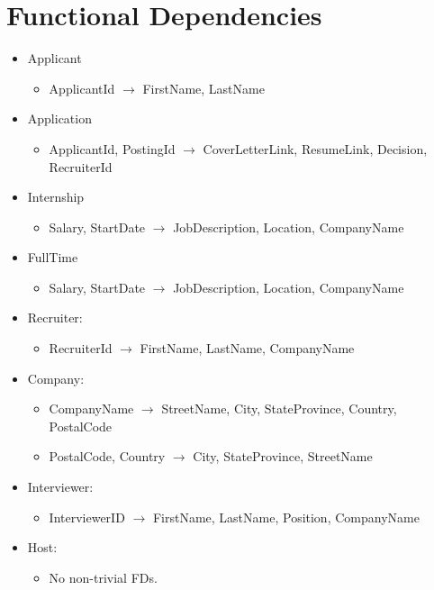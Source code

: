 \section{Functional Dependencies}

\begin{itemize}
  \item Applicant
    \begin{itemize}
      \item ApplicantId $ \to $ FirstName, LastName
    \end{itemize}
  \item Application
    \begin{itemize}
      \item ApplicantId, PostingId $ \to $ CoverLetterLink, ResumeLink, Decision, RecruiterId
    \end{itemize}
  \item Internship
    \begin{itemize}
      \item Salary, StartDate $ \to $ JobDescription, Location, CompanyName
    \end{itemize}
  \item FullTime
    \begin{itemize}
      \item Salary, StartDate $ \to $ JobDescription, Location, CompanyName
    \end{itemize}
  \item Recruiter:
    \begin{itemize}
      \item RecruiterId $ \to $ FirstName, LastName, CompanyName
    \end{itemize}
  \item Company:
    \begin{itemize}
      \item CompanyName $ \to $ StreetName, City, StateProvince, Country, PostalCode
      \item PostalCode, Country $ \to $ City, StateProvince, StreetName
    \end{itemize}
  \item Interviewer:
    \begin{itemize}
      \item InterviewerID $ \to $ FirstName, LastName, Position, CompanyName
    \end{itemize}
  \item Host:
    \begin{itemize}
      \item No non-trivial FDs.

\end{itemize}
\end{itemize}
